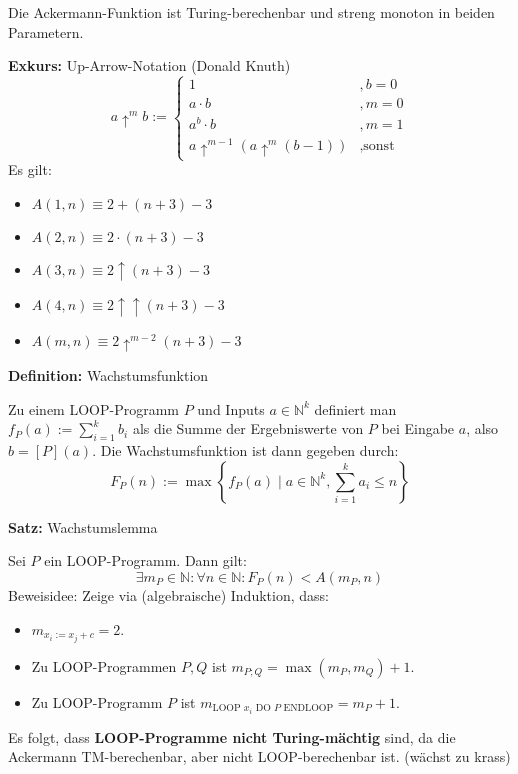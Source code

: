 \documentclass[a4paper,graphics,11pt]{article}
\begin{document}
Die Ackermann-Funktion ist Turing-berechenbar und streng monoton in beiden Parametern.

\strut

\textbf{Exkurs:} Up-Arrow-Notation (Donald Knuth)
$$
    a \uparrow^m b :=
    \begin{cases}
        1               &, b = 0\\
        a \cdot b       &, m = 0\\
        a^b \cdot b     &, m = 1\\
        a \uparrow^{m-1}(a \uparrow^m(b-1)) &, \text{sonst}
    \end{cases}
$$
Es gilt:
\begin{itemize}
    \item $A(1,n) \equiv 2 + (n+3) - 3$
    \item $A(2,n) \equiv 2 \cdot (n+3) - 3$
    \item $A(3,n) \equiv 2 \uparrow (n+3) - 3$
    \item $A(4,n) \equiv 2 \uparrow\uparrow (n+3) - 3$
    \item $A(m,n) \equiv 2 \uparrow^{m-2} (n+3) - 3$
\end{itemize}

\newpage

\textbf{Definition:} Wachstumsfunktion

Zu einem LOOP-Programm $P$ und Inputs $a \in \mathbb{N}^k$ definiert man
$
    f_P(a) := \sum_{i=1}^{k} b_i
$
als die Summe der Ergebniswerte von $P$ bei Eingabe $a$, also $b = [P](a)$.
Die Wachstumsfunktion ist dann gegeben durch:
$$
    F_P(n) := \max\left\{f_P(a) \mid a \in \mathbb{N}^k, \sum_{i=1}^{k} a_i \leq n\right\}
$$

\strut

\textbf{Satz:} Wachstumslemma

Sei $P$ ein LOOP-Programm. Dann gilt:
$$
    \exists m_P \in \mathbb{N} : \forall n \in \mathbb{N} : F_P(n) < A(m_P,n)
$$
Beweisidee: Zeige via (algebraische) Induktion, dass:
\begin{itemize}
    \item $m_{x_i := x_j + c} = 2$.
    \item Zu LOOP-Programmen $P,Q$ ist $m_{P;Q} = \max(m_P,m_Q)+1$.
    \item Zu LOOP-Programm $P$ ist $m_{\text{LOOP } x_i \text{ DO } P \text{ ENDLOOP}} = m_P + 1$.
\end{itemize}

Es folgt, dass \textbf{LOOP-Programme nicht Turing-mächtig} sind, da die Ackermann TM-berechenbar,
aber nicht LOOP-berechenbar ist. (wächst zu krass)
\end{document}
